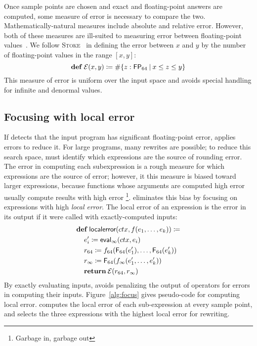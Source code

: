\documentclass[paper.tex]{subfiles}
\begin{document}
Once sample points are chosen and exact and floating-point answers
  are computed, some measure of error is necessary to compare the two.
Mathematically-natural measures include absolute and relative error.
However, both of these measures are ill-suited to measuring error
  between floating-point values~\cite{pldi14-stoke}.
We follow \textsc{Stoke}~\cite{pldi14-stoke}
  in defining the error between $x$ and $y$ by
  the number of floating-point values in the range $[x, y]$:
\[
\!def!\:\Err(x, y) \ceq \#\{ z : \FP_{64}\:|\:x \le z \le y \}
\]
This measure of error is uniform over the input space
  and avoids special handling for infinite and denormal values.

\subsection{Focusing with local error}

If \casio detects that the input program
  has significant floating-point error,
  \casio applies errors to reduce it.
For large programs, many rewrites are possible;
  to reduce this search space,
  \casio must identify which expressions are the source of rounding error.
The error in computing each subexpression
  is a rough measure for which expressions are the source of error;
  however, it this measure is biased toward larger expressions,
  because functions whose arguments are computed high error
  usually compute results with high error%
  \footnote{Garbage in, garbage out}.
\casio eliminates this bias by focusing on expressions
  with high \emph{local error}.
The local error of an expression
  is the error in its output if it were called with exactly-computed inputs:
\begin{align*}
  &\!def!\:\mathsf{localerror}(ctx, f(e_1, \dotsc, e_k)) \ceq \\
  &\> e_i' \ceq \mathsf{eval}_\infty(ctx, e_i) \\
  &\> r_{64} \ceq f_{64}(\F_{64}(e_1'), \dotsc, \F_{64}(e_k')) \\
  &\> r_\infty \ceq \F_{64}(f_\infty(e_1', \dotsc, e_k')) \\
  &\> \!return!\:\Err(r_{64}, r_\infty)
\end{align*}
By exactly evaluating inputs,
  \casio avoids penalizing the output of operators
  for errors in computing their inputs.
Figure~\ref{alg:focus} gives pseudo-code for computing local error.
\casio computes the local error of each sub-expression at every sample point,
  and selects the three expressions with the highest local error
  for rewriting.
\end{document}
